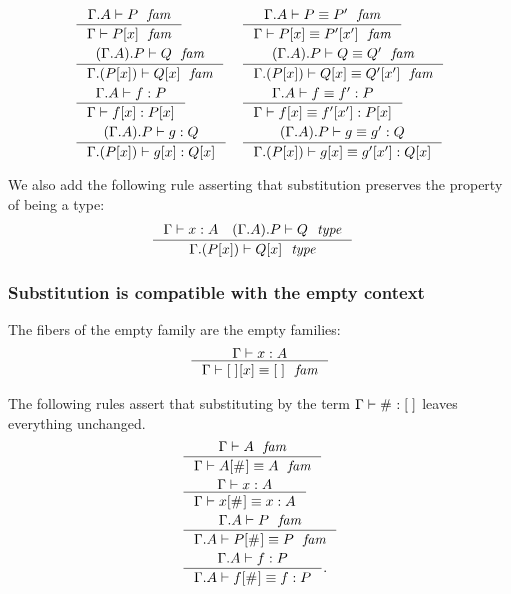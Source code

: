 \begin{align}
& \inference{\jfam{\ctxext{\Gamma}{A}}{P}}{\jfam{\Gamma}{\subst{x}{P}}}
& & \inference{\jfameq{\ctxext{\Gamma}{A}}{P}{P'}}{\jfameq{\Gamma}{\subst{x}{P}}{\subst{x'}{P'}}}\\
& \inference{\jfam{\ctxext{{\Gamma}{A}}{P}}{Q}}{\jfam{\ctxext{\Gamma}{\subst{x}{P}}}{\subst{x}{Q}}}
& & \inference{\jfameq{\ctxext{{\Gamma}{A}}{P}}{Q}{Q'}}{\jfameq{\ctxext{\Gamma}{\subst{x}{P}}}{\subst{x}{Q}}{\subst{x'}{Q'}}}\\
& \inference{\jterm{\ctxext{\Gamma}{A}}{P}{f}}{\jterm{\Gamma}{\subst{x}{P}}{\subst{x}{f}}}
& & \inference{\jtermeq{\ctxext{\Gamma}{A}}{P}{f}{f'}}{\jtermeq{\Gamma}{\subst{x}{P}}{\subst{x}{f}}{\subst{x'}{f'}}}\\
& \inference{\jterm{\ctxext{{\Gamma}{A}}{P}}{Q}{g}}{\jterm{\ctxext{\Gamma}{\subst{x}{P}}}{\subst{x}{Q}}{\subst{x}{g}}}
& &\inference{\jtermeq{\ctxext{{\Gamma}{A}}{P}}{Q}{g}{g'}}{\jtermeq{\ctxext{\Gamma}{\subst{x}{P}}}{\subst{x}{Q}}{\subst{x}{g}}{\subst{x'}{g'}}}
\end{align}

We also add the following rule asserting that substitution preserves the
property of being a type:
\begin{align}
& \inference{\jterm{\Gamma}{A}{x}\quad\jtype{\ctxext{{\Gamma}{A}}{P}}{Q}}{\jtype{\ctxext{\Gamma}{\subst{x}{P}}}{\subst{x}{Q}}}
\end{align}

\subsubsection{Substitution is compatible with the empty context}
The fibers of the empty family are the empty families:
\begin{equation}
\inference{\jterm{\Gamma}{A}{x}}{\jfameq{\Gamma}{\subst{x}{\emptyf}}{\emptyf}}
\end{equation}

The following rules assert that substituting by the term $\jterm{\Gamma}{\emptyf}{\emptytm}$
leaves everything unchanged.
\begin{align}
& \inference{\jfam{\Gamma}{A}}{\jfameq{\Gamma}{\subst{\emptytm}{A}}{A}}\\
& \inference{\jterm{\Gamma}{A}{x}}{\jtermeq{\Gamma}{A}{\subst{\emptytm}{x}}{x}}\\
& \inference{\jfam{\ctxext{\Gamma}{A}}{P}}{\jfameq{\ctxext{\Gamma}{A}}{\subst{\emptytm}{P}}{P}}\\
& \inference{\jterm{\ctxext{\Gamma}{A}}{P}{f}}{\jtermeq{\ctxext{\Gamma}{A}}{P}{\subst{\emptytm}{f}}{f}}.
\end{align}

